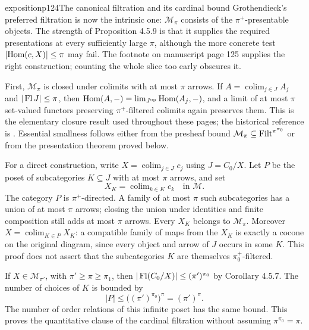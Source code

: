 \begin{dcomment}{exposition}{p124}{The canonical filtration and its cardinal bound}
Grothendieck's preferred filtration is now the intrinsic one: $\mathcal M_\pi$ consists of the $\pi^+$-presentable objects. The strength of Proposition 4.5.9 is that it supplies the required presentations at every sufficiently large $\pi$, although the more concrete test $|\mathrm{Hom}(c,X)|\leq\pi$ may fail. The footnote on manuscript page 125 supplies the right construction; counting the whole slice too early obscures it.

First, $\mathcal M_\pi$ is closed under colimits with at most $\pi$ arrows. If $A=\operatorname{colim}_{j\in J}A_j$ and $|\operatorname{Fl} J|\leq\pi$, then $\mathrm{Hom}(A,-)=\lim_{J^{\mathrm{op}}}\mathrm{Hom}(A_j,-)$, and a limit of at most $\pi$ set-valued functors preserving $\pi^+$-filtered colimits again preserves them. This is the elementary closure result used throughout these pages; the historical reference is \citet[Expos\'e I, 9.8--9.9]{SGA4I1972}. Essential smallness follows either from the presheaf bound $\mathcal M_\pi\subseteq\operatorname{Filt}^{\pi^{\pi_0}}$ or from the presentation theorem proved below.

For a direct construction, write $X=\operatorname{colim}_{j\in J}c_j$ using $J=C_0/X$. Let $P$ be the poset of subcategories $K\subseteq J$ with at most $\pi$ arrows, and set
\[
 X_K=\operatorname{colim}_{k\in K}c_k\quad\text{in }\mathcal M.
\]
The category $P$ is $\pi^+$-directed. A family of at most $\pi$ such subcategories has a union of at most $\pi$ arrows; closing the union under identities and finite composition still adds at most $\pi$ arrows. Every $X_K$ belongs to $\mathcal M_\pi$. Moreover $X=\operatorname{colim}_{K\in P}X_K$: a compatible family of maps from the $X_K$ is exactly a cocone on the original diagram, since every object and arrow of $J$ occurs in some $K$. This proof does not assert that the subcategories $K$ are themselves $\pi_0^+$-filtered.

If $X\in\mathcal M_{\pi'}$, with $\pi'\geq\pi\geq\pi_1$, then $|\operatorname{Fl}(C_0/X)|\leq(\pi')^{\pi_0}$ by Corollary 4.5.7. The number of choices of $K$ is bounded by
\[
 |P|\leq\bigl((\pi')^{\pi_0}\bigr)^\pi
      =(\pi')^\pi.
\]
The number of order relations of this infinite poset has the same bound. This proves the quantitative clause of the cardinal filtration without assuming $\pi^{\pi_0}=\pi$.


\end{dcomment}
